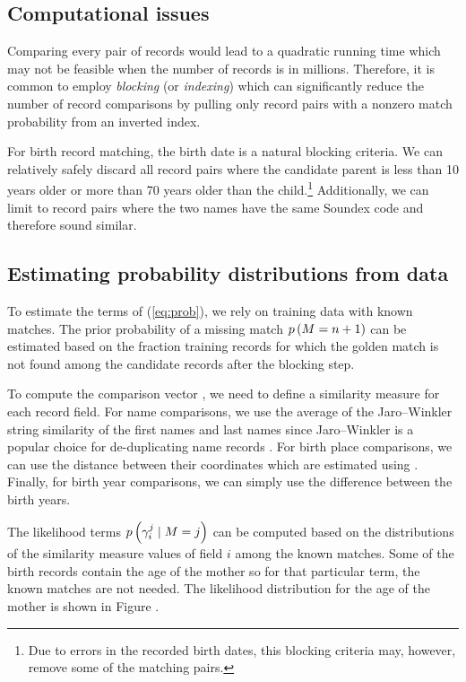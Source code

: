 \documentclass[sigconf]{acmart}
\begin{document}
\subsection{Computational issues}

Comparing every pair of records would lead to a quadratic running time which 
may not be feasible when the number of records is in millions. Therefore, it is 
common to employ \emph{blocking} (or \emph{indexing}) which can significantly 
reduce the number of record comparisons \cite{christen2012} by pulling only 
record pairs with a nonzero match probability from an inverted index.

For birth record matching, the birth date is a natural blocking criteria. We 
can relatively safely discard all record pairs where the candidate parent is 
less than 10 years older or more than 70 years older than the 
child.\footnote{Due to errors in the recorded birth dates, this blocking 
criteria may, however, remove some of the matching pairs.} Additionally, we can 
limit to record pairs where the two names have the same Soundex code and 
therefore sound similar.

\subsection{Estimating probability distributions from data}
\label{sec:estimation}

To estimate the terms of (\ref{eq:prob}), we rely on training data with known 
matches. The prior probability of a missing match $p\left(M=n+1\right)$ can be estimated 
based on the fraction training records for which the golden match is not found 
among the candidate records after the blocking step.

To compute the comparison vector \comps, we need to define a similarity measure 
for each record field.
For name comparisons, we use the average of the Jaro--Winkler string similarity 
of the first names and last names since Jaro--Winkler is a popular choice for 
de-duplicating name records \cite{winkler1990}. For birth place comparisons, we 
can use the distance between their coordinates which are estimated using 
\cite{malmi2015}. Finally, for birth year comparisons, we can simply use the 
difference between the birth years.

The likelihood terms $p\left(\gamma^{j}_{i} \mid M=j\right)$ can be computed based on the 
distributions of the similarity measure values of field $i$ among the known 
matches. Some of the birth records contain the age of the mother so for that 
particular term, the known matches are not needed. The likelihood distribution 
for the age of the mother is shown in Figure .
\end{document}
